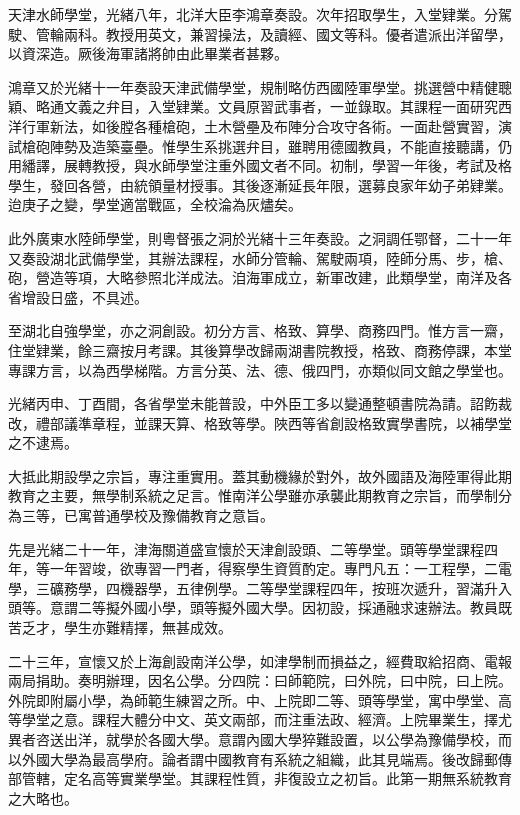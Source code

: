 \begin{pinyinscope}
天津水師學堂，光緒八年，北洋大臣李鴻章奏設。次年招取學生，入堂肄業。分駕駛、管輪兩科。教授用英文，兼習操法，及讀經、國文等科。優者遣派出洋留學，以資深造。厥後海軍諸將帥由此畢業者甚夥。

鴻章又於光緒十一年奏設天津武備學堂，規制略仿西國陸軍學堂。挑選營中精健聰穎、略通文義之弁目，入堂肄業。文員原習武事者，一並錄取。其課程一面研究西洋行軍新法，如後膛各種槍砲，土木營壘及布陣分合攻守各術。一面赴營實習，演試槍砲陣勢及造築臺壘。惟學生系挑選弁目，雖聘用德國教員，不能直接聽講，仍用繙譯，展轉教授，與水師學堂注重外國文者不同。初制，學習一年後，考試及格學生，發回各營，由統領量材授事。其後逐漸延長年限，選募良家年幼子弟肄業。迨庚子之變，學堂適當戰區，全校淪為灰燼矣。

此外廣東水陸師學堂，則粵督張之洞於光緒十三年奏設。之洞調任鄂督，二十一年又奏設湖北武備學堂，其辦法課程，水師分管輪、駕駛兩項，陸師分馬、步，槍、砲，營造等項，大略參照北洋成法。洎海軍成立，新軍改建，此類學堂，南洋及各省增設日盛，不具述。

至湖北自強學堂，亦之洞創設。初分方言、格致、算學、商務四門。惟方言一齋，住堂肄業，餘三齋按月考課。其後算學改歸兩湖書院教授，格致、商務停課，本堂專課方言，以為西學梯階。方言分英、法、德、俄四門，亦類似同文館之學堂也。

光緒丙申、丁酉間，各省學堂未能普設，中外臣工多以變通整頓書院為請。詔飭裁改，禮部議準章程，並課天算、格致等學。陜西等省創設格致實學書院，以補學堂之不逮焉。

大抵此期設學之宗旨，專注重實用。蓋其動機緣於對外，故外國語及海陸軍得此期教育之主要，無學制系統之足言。惟南洋公學雖亦承襲此期教育之宗旨，而學制分為三等，已寓普通學校及豫備教育之意旨。

先是光緒二十一年，津海關道盛宣懷於天津創設頭、二等學堂。頭等學堂課程四年，等一年習竣，欲專習一門者，得察學生資質酌定。專門凡五：一工程學，二電學，三礦務學，四機器學，五律例學。二等學堂課程四年，按班次遞升，習滿升入頭等。意謂二等擬外國小學，頭等擬外國大學。因初設，採通融求速辦法。教員既苦乏才，學生亦難精擇，無甚成效。

二十三年，宣懷又於上海創設南洋公學，如津學制而損益之，經費取給招商、電報兩局捐助。奏明辦理，因名公學。分四院：曰師範院，曰外院，曰中院，曰上院。外院即附屬小學，為師範生練習之所。中、上院即二等、頭等學堂，寓中學堂、高等學堂之意。課程大體分中文、英文兩部，而注重法政、經濟。上院畢業生，擇尤異者咨送出洋，就學於各國大學。意謂內國大學猝難設置，以公學為豫備學校，而以外國大學為最高學府。論者謂中國教育有系統之組織，此其見端焉。後改歸郵傳部管轄，定名高等實業學堂。其課程性質，非復設立之初旨。此第一期無系統教育之大略也。


\end{pinyinscope}
